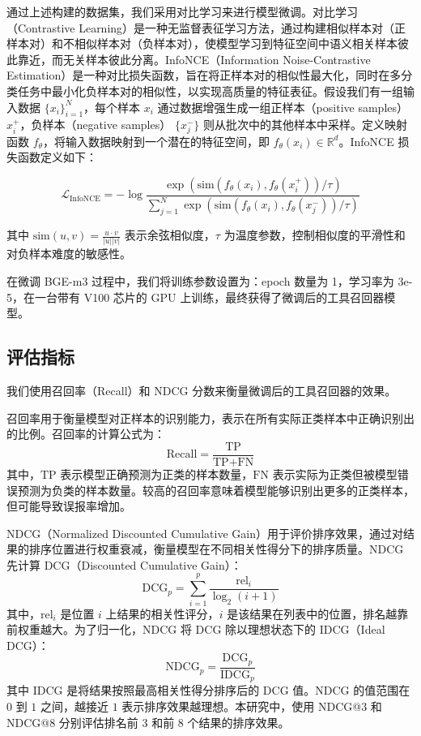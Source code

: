 通过上述构建的数据集，我们采用对比学习来进行模型微调。对比学习（Contrastive Learning）是一种无监督表征学习方法，通过构建相似样本对（正样本对）和不相似样本对（负样本对），使模型学习到特征空间中语义相关样本彼此靠近，而无关样本彼此分离。InfoNCE（Information Noise-Contrastive Estimation）是一种对比损失函数，旨在将正样本对的相似性最大化，同时在多分类任务中最小化负样本对的相似性，以实现高质量的特征表征。假设我们有一组输入数据 $\{x_i\}_{i=1}^N$，每个样本 $x_i$ 通过数据增强生成一组正样本（positive samples）$x_i^+$，负样本（negative samples） $\{x_j^-\}$ 则从批次中的其他样本中采样。定义映射函数 $f_{\theta}$，将输入数据映射到一个潜在的特征空间，即 $f_{\theta}(x_i) \in \mathbb{R}^d$。InfoNCE 损失函数定义如下：

\begin{equation}
\mathcal{L}_{\text{InfoNCE}} = -\log \frac{\exp(\text{sim}(f_{\theta}(x_i), f_{\theta}(x_i^+))/\tau)}{\sum_{j=1}^N \exp(\text{sim}(f_{\theta}(x_i), f_{\theta}(x_j^-))/\tau)}
\end{equation}

其中 $\text{sim}(u, v) = \frac{u \cdot v}{|u| |v|}$ 表示余弦相似度，$\tau$ 为温度参数，控制相似度的平滑性和对负样本难度的敏感性。

在微调 BGE-m3 过程中，我们将训练参数设置为：epoch 数量为 1，学习率为 3e-5，在一台带有 V100 芯片的 GPU 上训练，最终获得了微调后的工具召回器模型。

\subsection{评估指标}

我们使用召回率（Recall）\cite{buckland1994relationship, powers2020evaluation}和 NDCG 分数\cite{wang2013theoretical}来衡量微调后的工具召回器的效果。

召回率用于衡量模型对正样本的识别能力，表示在所有实际正类样本中正确识别出的比例。召回率的计算公式为：
\begin{equation}
\text{Recall} = \frac{\text{TP}}{\text{TP} + \text{FN}}
\end{equation}
其中，$\text{TP}$ 表示模型正确预测为正类的样本数量，$\text{FN}$ 表示实际为正类但被模型错误预测为负类的样本数量。较高的召回率意味着模型能够识别出更多的正类样本，但可能导致误报率增加。

NDCG（Normalized Discounted Cumulative Gain）用于评价排序效果，通过对结果的排序位置进行权重衰减，衡量模型在不同相关性得分下的排序质量。NDCG 先计算 DCG（Discounted Cumulative Gain）：
\begin{equation}
\text{DCG}_p = \sum_{i=1}^{p} \frac{\text{rel}_i}{\log_2(i+1)}
\end{equation}
其中，$\text{rel}_i$ 是位置 $i$ 上结果的相关性评分，$i$ 是该结果在列表中的位置，排名越靠前权重越大。为了归一化，NDCG 将 DCG 除以理想状态下的 IDCG（Ideal DCG）：
\begin{equation}
\text{NDCG}_p = \frac{\text{DCG}_p}{\text{IDCG}_p}
\end{equation}
其中 IDCG 是将结果按照最高相关性得分排序后的 DCG 值。NDCG 的值范围在 $0$ 到 $1$ 之间，越接近 $1$ 表示排序效果越理想。本研究中，使用 NDCG@3 和 NDCG@8 分别评估排名前 3 和前 8 个结果的排序效果。


